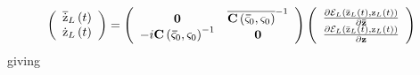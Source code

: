 \documentclass[aps,preprint]{revtex4}%
\begin{document}
\begin{equation}
\left(
\begin{array}
[c]{c}%
\overline{\mathrm{\dot{z}}}_{L}\left(  t\right)  \\
\mathrm{\dot{z}}_{L}\left(  t\right)
\end{array}
\right)  =\left(
\begin{array}
[c]{cc}%
\mathbf{0} & \overline{\mathbf{C}\left(  \mathbf{\bar{\varsigma}}%
_{0},\mathbf{\varsigma}_{0}\right)  }^{-1}\\
-i\mathbf{C}\left(  \mathbf{\bar{\varsigma}}_{0},\mathbf{\varsigma}%
_{0}\right)  ^{-1} & \mathbf{0}%
\end{array}
\right)  \left(
\begin{array}
[c]{c}%
\frac{\partial\mathcal{E}_{L}\left(  \mathrm{\bar{z}}_{L}\left(  t\right)
,\mathrm{z}_{L}\left(  t\right)  \right)  }{\partial\mathbf{\bar{z}}}\\
\frac{\partial\mathcal{E}_{L}\left(  \mathrm{\bar{z}}_{L}\left(  t\right)
,\mathrm{z}_{L}\left(  t\right)  \right)  }{\partial\mathbf{z}}%
\end{array}
\right)
\end{equation}
giving
\end{document}
